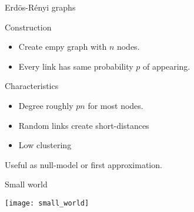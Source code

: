 \documentclass[hide notes,compress]{beamer}
\begin{document}
\begin{frame}[c]{Erdös-Rényi graphs}
  \begin{block}{Construction}
    \begin{itemize}
      \item Create empy graph with $n$ nodes.
      \item Every link has same probability $p$ of appearing.
    \end{itemize}
  \end{block}

  \begin{block}{Characteristics}
    \begin{itemize}
      \item Degree roughly $pn$ for most nodes.
      \item Random links create short-distances
      \item Low clustering
    \end{itemize}  
  \end{block}

  Useful as null-model or first approximation.
\end{frame}
\begin{frame}[c]{Small world}
  \begin{center}
    \texttt{[image: small\_world]}
  \end{center}
\end{frame}
\end{document}
